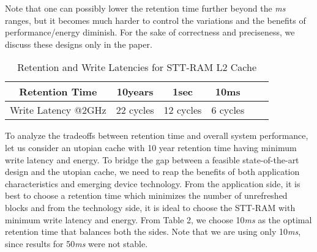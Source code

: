 Note that one can possibly lower the retention time further beyond the {\it ms} ranges, but it becomes much harder to control the variations and the benefits of performance/energy diminish. For the sake of correctness and preciseness, we discuss these designs only in the paper.



\begin{table*}[t]
  \centering
  \scriptsize
  \caption{Retention and Write Latencies for STT-RAM L2 Cache}
  \label{table:rt-wt}
  \begin{tabular}{| c | c | c | c | c | c |}
  	\hline
	 Retention Time & 10years & 1sec &10ms \\
	\hline
	Write Latency @2GHz & 22 cycles & 12 cycles & 6 cycles \\
	\hline
  \end{tabular}
\end{table*}

To analyze the tradeoffs between retention time and overall system performance, let us consider an utopian cache
with 10 year retention time having minimum write latency and energy.  To bridge the gap between a
feasible state-of-the-art design and the utopian cache, we need to reap the benefits of both application
characteristics and emerging device technology. From the application side, it is best to choose a retention time
which minimizes the number of unrefreshed blocks and from the technology side, it is ideal to choose the
STT-RAM with minimum write latency and energy. From Table 2, we choose 10{\it ms} as the optimal retention time that
balances both the sides. Note that we are using only 10{\it ms}, since results for 50{\it ms} were not stable.








